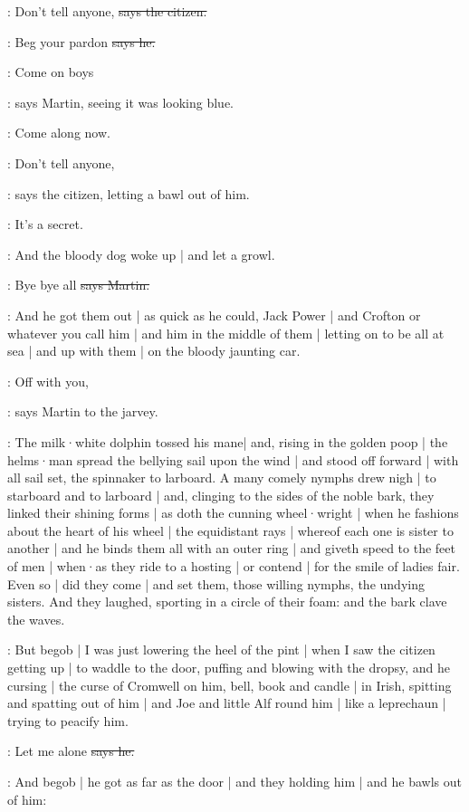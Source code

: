 \citizen:
Don't tell anyone,
\sout{says the citizen.}

\Bloom:
Beg your pardon
\sout{says he.}

\cunningham:
Come on boys

\Nq:
says Martin,
seeing it was looking blue.

\cunningham:
Come along now.

\citizen:
Don't tell anyone,

\Nq:
says the citizen,
letting a bawl out of him.

\citizen:
It's a secret.

\Nq:
And the bloody dog woke up |
and let a growl.

\cunningham:
Bye bye all
\sout{says Martin.}

\Nq:
And he got them out |
as quick as he could,
Jack Power |
and Crofton or whatever you call him |
and him in the middle of them |
letting on to be all at sea
 |
and up with them |
on the bloody jaunting car.

\cunningham:
Off with you,

\Nq:
says Martin to the jarvey.

:
The milk·white dolphin tossed his mane|
and,
rising in the golden poop |
the helms·man spread the bellying sail upon the wind |
and stood off forward |
with all sail set,
the spinnaker to larboard.
A many comely nymphs drew nigh |
to starboard and to larboard |
and,
clinging to the sides of the noble bark,
they linked their shining forms |
as doth the cunning wheel·wright |
when he fashions about the heart of his wheel |
the equidistant rays |
whereof each one is sister to another |
and he binds them all with an outer ring |
and giveth speed to the feet of men |
when·as they ride to a hosting |
or contend |
for the smile of ladies fair.
Even so |
did they come |
and set them,
those willing nymphs,
the undying sisters.
And they laughed,
sporting in a circle of their foam:
and the bark clave the waves.

\Nq:
But begob |
I was just lowering the heel of the pint |
when I saw the citizen getting up |
to waddle to the door,
puffing and blowing with the dropsy,
and he cursing |
the curse of Cromwell on him,
bell, book and candle |
in Irish,
spitting and spatting out of him |
and Joe and little Alf round him |
like a leprechaun |
trying to peacify him.

\citizen:
Let me alone
\sout{says he.}

\Nq:
And begob |
he got as far as the door |
and they holding him |
and he bawls out of him:%

